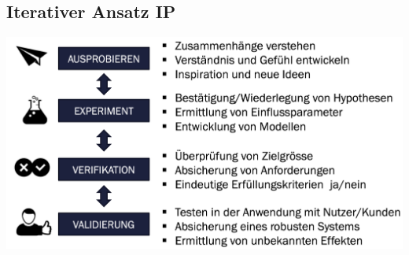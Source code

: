 \subsection{Iterativer Ansatz \hfill IP}
\begin{center}
    \includegraphics[width = 0.9\linewidth]{src/images/MAEIP_Testing}
\end{center}